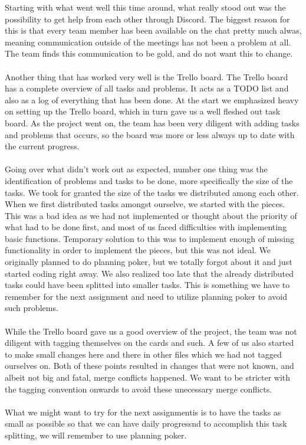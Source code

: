 \documentclass{article}
\begin{document}
\maketitle
Starting with what went well this time around, what really stood out was the possibility to get help from each other through Discord. The biggest reason for this is that every team member has been available on the chat pretty much alwas, meaning communication outside of the meetings has not been a problem at all. The team finds this communication to be gold, and do not want this to change.\\\\
Another thing that has worked very well is the Trello board. The Trello board has a complete overview of all tasks and problems. It acts as a TODO list and also as a log of everything that has been done. At the start we emphasized heavy on setting up the Trello board, which in turn gave us a well fleshed out task board. As the project went on, the team has been very diligent with adding tasks and problems that occurs, so the board was more or less always up to date with the current progress.\\\\
Going over what didn't work out as expected, number one thing was the identification of problems and tasks to be done, more specifically the size of the tasks. We took for granted the size of the tasks we distributed among each other. When we first distributed tasks amongst ourselve, we started with the pieces. This was a bad idea as we had not implemented or thought about the priority of what had to be done first, and most of us faced difficulties with implementing basic functions. Temporary solution to this was to implement enough of missing functionality in order to implement the pieces, but this was not ideal. We originally planned to do planning poker, but we totally forgot about it and just started coding right away. We also realized too late that the already distributed tasks could have been splitted into smaller tasks. This is something we have to remember for the next assignment and need to utilize planning poker to avoid such problems.\\\\
While the Trello board gave us a good overview of the project, the team was not diligent with tagging themselves on the cards and such. A few of us also started to make small changes here and there in other files which we had not tagged ourselves on. Both of these points resulted in changes that were not known, and albeit not big and fatal, merge conflicts happened. We want to be stricter with the tagging convention onwards to avoid these unecessary merge conflicts.\\\\
What we might want to try for the next assignmentis is to have the tasks as small as possible so that we can have daily progressnd to accomplish this task splitting, we will remember to use planning poker.
\end{document}
